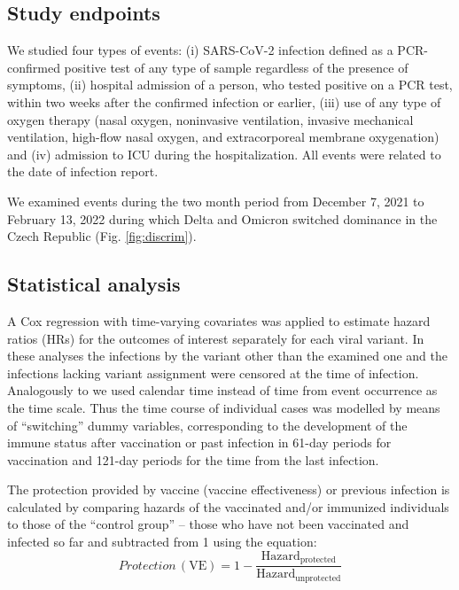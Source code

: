 \documentclass[9pt,twocolumn,twoside,lineno]{pnas-new}
\begin{document}
\subsection*{Study endpoints}

We studied four types of events: (i) SARS-CoV-2 infection defined as a PCR-confirmed positive test of any type of sample regardless of the presence of symptoms, (ii) hospital admission of a person, who tested positive on a PCR test, within two weeks after the confirmed infection or earlier, (iii) use of any type of oxygen therapy (nasal oxygen, noninvasive ventilation, invasive mechanical ventilation, high-flow nasal oxygen, and extracorporeal membrane oxygenation) and (iv) admission to ICU during the hospitalization. All events were related to the date of infection report.

We examined events during the two month period from December 7, 2021 to February 13, 2022 during which Delta and Omicron switched dominance in the Czech Republic (Fig. \ref{fig:discrim}). 

\subsection*{Statistical analysis}
A Cox regression with time-varying covariates was applied to estimate hazard ratios (HRs) for the outcomes of interest separately for each viral variant. In these analyses the infections by the variant other than the examined one and the infections lacking variant assignment were censored at the time of infection. Analogously to \citep{tartof2021effectiveness} we used calendar time instead of time from event occurrence as the time scale. Thus the time course of individual cases was modelled by means of ``switching'' dummy variables, corresponding to the development of the immune status after vaccination or past infection in 61-day periods for vaccination and 121-day periods for the time from the last infection.

The protection provided by vaccine (vaccine effectiveness) or previous infection is calculated by comparing hazards of the vaccinated and/or immunized individuals to those of the  ``control group'' -- those who have not been vaccinated and infected so far and subtracted from 1 using the equation:
\begin{equation}
Protection\, (\mbox{VE}) = 1 -  \frac{\mathrm{Hazard_{protected}}}{\mathrm{Hazard_{unprotected}}}
\label{eq1}
\end{equation}
\end{document}

